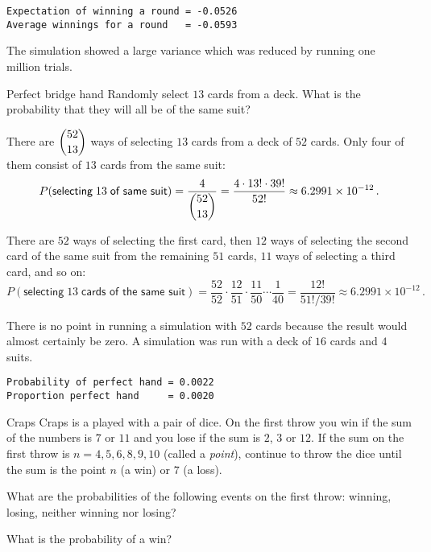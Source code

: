 \sml{}
\begin{verbatim}
Expectation of winning a round = -0.0526
Average winnings for a round   = -0.0593
\end{verbatim}
The simulation showed a large variance which was reduced by running one million trials.


\begin{prob}{Perfect bridge hand}
Randomly select $13$ cards from a deck. What is the probability that they will all be of the same suit?
\end{prob}


There are $\displaystyle{52 \choose 13}$ ways of selecting $13$ cards from a deck of $52$ cards. Only four of them consist of $13$ cards from the same suit:
\[
P(\textsf{selecting}\;13\;\textsf{of same suit})=\frac{4}{\displaystyle{52 \choose 13}}=\frac{4\cdot 13!\cdot 39!}{52!}\approx 6.2991\times 10^{-12}\,.
\]


There are $52$ ways of selecting the first card, then $12$ ways of selecting the second card of the same suit from the remaining $51$ cards, $11$ ways of selecting a third card, and so on:
\[
P(\textsf{selecting}\;13\;\textsf{cards of the same suit})=\frac{52}{52}\cdot \frac{12}{51}\cdot \frac{11}{50} \cdots  \frac{1}{40}= \frac{12!}{51!/39!}\approx 6.2991\times 10^{-12}\,.
\]

\newpage

\sml{}

There is no point in running a simulation with $52$ cards because the result would almost certainly be zero. A simulation was run with a deck of $16$ cards and $4$ suits.

\begin{verbatim}
Probability of perfect hand = 0.0022
Proportion perfect hand     = 0.0020
\end{verbatim}


\begin{prob}{Craps}
Craps is a played with a pair of dice. On the first throw you win if the sum of the numbers is $7$ or $11$ and you lose if the sum is $2$, $3$ or $12$. If the sum on the first throw is $n=4,5,6,8,9,10$ (called a \emph{point}), continue to throw the dice until the sum is the point $n$ (a win) or $7$ (a loss).

 What are the probabilities of the following events on the first throw: winning, losing, neither winning nor losing?

 What is the probability of a win?
\end{prob}

